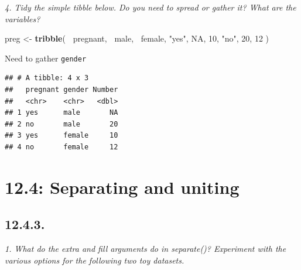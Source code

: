 \documentclass[]{book}
\newenvironment{Shaded}{\begin{snugshade}}{\end{snugshade}}
\newcommand{\DataTypeTok}[1]{\textcolor[rgb]{0.13,0.29,0.53}{#1}}
\newcommand{\DecValTok}[1]{\textcolor[rgb]{0.00,0.00,0.81}{#1}}
\newcommand{\KeywordTok}[1]{\textcolor[rgb]{0.13,0.29,0.53}{\textbf{#1}}}
\newcommand{\NormalTok}[1]{#1}
\newcommand{\OperatorTok}[1]{\textcolor[rgb]{0.81,0.36,0.00}{\textbf{#1}}}
\newcommand{\OtherTok}[1]{\textcolor[rgb]{0.56,0.35,0.01}{#1}}
\newcommand{\StringTok}[1]{\textcolor[rgb]{0.31,0.60,0.02}{#1}}
\theoremstyle{definition}
\theoremstyle{definition}
\theoremstyle{definition}
\theoremstyle{remark}
\begin{document}
\emph{4. Tidy the simple tibble below. Do you need to spread or gather
it? What are the variables?}

\begin{Shaded}
\begin{Highlighting}[]
\NormalTok{preg <-}\StringTok{ }\KeywordTok{tribble}\NormalTok{(}
  \OperatorTok{~}\NormalTok{pregnant, }\OperatorTok{~}\NormalTok{male, }\OperatorTok{~}\NormalTok{female,}
  \StringTok{"yes"}\NormalTok{,     }\OtherTok{NA}\NormalTok{,    }\DecValTok{10}\NormalTok{,}
  \StringTok{"no"}\NormalTok{,      }\DecValTok{20}\NormalTok{,    }\DecValTok{12}
\NormalTok{)}
\end{Highlighting}
\end{Shaded}

Need to gather \texttt{gender}

\begin{Shaded}
\end{Shaded}

\begin{verbatim}
## # A tibble: 4 x 3
##   pregnant gender Number
##   <chr>    <chr>   <dbl>
## 1 yes      male       NA
## 2 no       male       20
## 3 yes      female     10
## 4 no       female     12
\end{verbatim}

\hypertarget{separating-and-uniting}{%
\section{12.4: Separating and uniting}\label{separating-and-uniting}}

\hypertarget{section-33}{%
\subsection{12.4.3.}\label{section-33}}

\emph{1. What do the extra and fill arguments do in separate()?
Experiment with the various options for the following two toy datasets.}

\begin{Shaded}
\end{Shaded}
\end{document}

